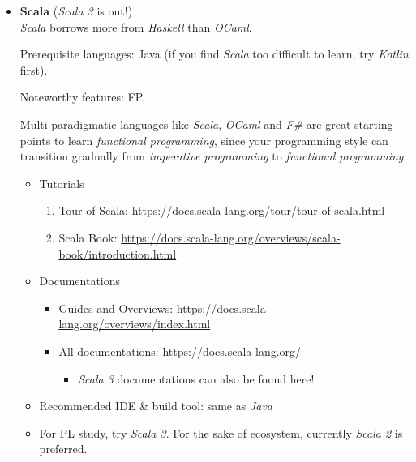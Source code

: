 \documentclass{article}
\begin{document}
\begin{itemize}
    \item \textbf{Scala} (\emph{Scala 3} is out!)\\
    
    \emph{Scala} borrows more from \emph{Haskell} than \emph{OCaml}.
    
    Prerequisite languages: Java (if you find \emph{Scala} too difficult to learn, try \emph{Kotlin} first).
    
    Noteworthy features: FP.
    
    Multi-paradigmatic languages like \emph{Scala}, \emph{OCaml} and \emph{F\#} are great starting points to learn \emph{functional programming}, since your programming style can transition gradually from \emph{imperative programming} to \emph{functional programming}.
    \begin{itemize}
        \item Tutorials
        \begin{enumerate}
            \item Tour of Scala:
            \href{https://docs.scala-lang.org/tour/tour-of-scala.html}{https://docs.scala-lang.org/tour/tour-of-scala.html}
            \item Scala Book:
            \href{https://docs.scala-lang.org/overviews/scala-book/introduction.html}{https://docs.scala-lang.org/overviews/scala-book/introduction.html}

        \end{enumerate}
        \item Documentations
        \begin{itemize}
            \item Guides and Overviews:
            \href{https://docs.scala-lang.org/overviews/index.html}{https://docs.scala-lang.org/overviews/index.html}
            \item All documentations:
            \href{https://docs.scala-lang.org/}{https://docs.scala-lang.org/}
                \begin{itemize}
                    \item \emph{Scala 3} documentations can also be found here!
                \end{itemize}
        \end{itemize}
        \item Recommended IDE \& build tool: same as \emph{Java}
        \item For PL study, try \emph{Scala 3}.
        For the sake of ecosystem, currently \emph{Scala 2} is preferred.
        \end{itemize}
        

\end{itemize}
\end{document}
